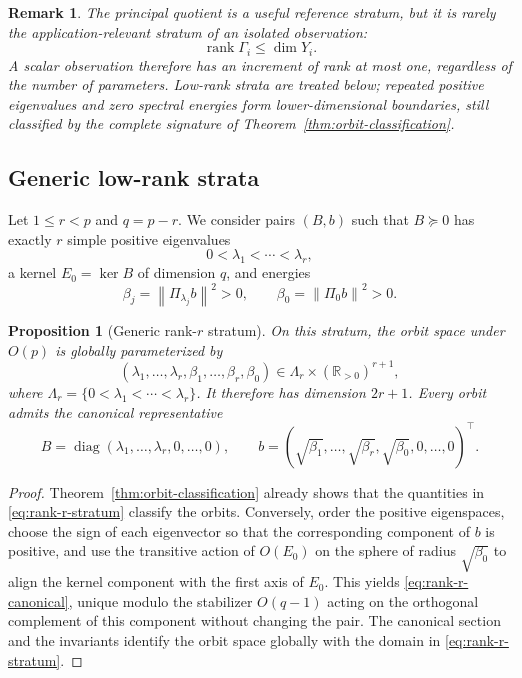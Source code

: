 \documentclass[10pt,a4paper]{article}
\newtheorem{proposition}[theorem]{Proposition}
\newtheorem{remark}[theorem]{Remark}
\newcommand{\R}{\mathbb{R}}
\newcommand{\Ker}{\operatorname{ker}}
\newcommand{\rank}{\operatorname{rank}}
\newcommand{\diag}{\operatorname{diag}}
\newcommand{\norm}[1]{\left\lVert #1\right\rVert}
\begin{document}
\begin{remark}
The principal quotient is a useful reference stratum, but it is rarely the application-relevant stratum of an isolated observation:
\[
\rank\Gamma_i\leq\dim Y_i.
\]
A scalar observation therefore has an increment of rank at most one, regardless of the number of parameters. Low-rank strata are treated below; repeated positive eigenvalues and zero spectral energies form lower-dimensional boundaries, still classified by the complete signature of Theorem~\ref{thm:orbit-classification}.
\end{remark}

\subsection{Generic low-rank strata}
Let $1\leq r<p$ and $q=p-r$. We consider pairs $(B,b)$ such that $B\succeq0$ has exactly $r$ simple positive eigenvalues
\[
0<\lambda_1<\cdots<\lambda_r,
\]
a kernel $E_0=\Ker B$ of dimension $q$, and energies
\[
\beta_j=\norm{\Pi_{\lambda_j}b}^2>0,
\qquad
\beta_0=\norm{\Pi_0b}^2>0.
\]

\begin{proposition}[Generic rank-$r$ stratum]
On this stratum, the orbit space under $O(p)$ is globally parameterized by
\begin{equation}
\boxed{
(\lambda_1,\ldots,\lambda_r,
 \beta_1,\ldots,\beta_r,\beta_0)
\in
\Lambda_r\times(\R_{>0})^{r+1},
}
\label{eq:rank-r-stratum}
\end{equation}
where $\Lambda_r=\{0<\lambda_1<\cdots<\lambda_r\}$. It therefore has dimension $2r+1$. Every orbit admits the canonical representative
\begin{equation}
B=\diag(\lambda_1,\ldots,\lambda_r,0,\ldots,0),
\qquad
b=(\sqrt{\beta_1},\ldots,\sqrt{\beta_r},\sqrt{\beta_0},0,\ldots,0)^\top.
\label{eq:rank-r-canonical}
\end{equation}
\label{prop:rank-r-stratum}
\end{proposition}

\begin{proof}
Theorem~\ref{thm:orbit-classification} already shows that the quantities in \eqref{eq:rank-r-stratum} classify the orbits. Conversely, order the positive eigenspaces, choose the sign of each eigenvector so that the corresponding component of $b$ is positive, and use the transitive action of $O(E_0)$ on the sphere of radius $\sqrt{\beta_0}$ to align the kernel component with the first axis of $E_0$. This yields \eqref{eq:rank-r-canonical}, unique modulo the stabilizer $O(q-1)$ acting on the orthogonal complement of this component without changing the pair. The canonical section and the invariants identify the orbit space globally with the domain in \eqref{eq:rank-r-stratum}.
\end{proof}
\end{document}
